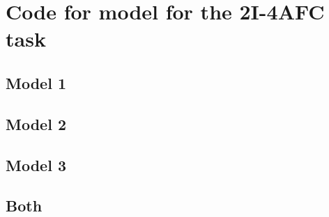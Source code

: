 \documentclass{article}\usepackage{knitr}
\begin{document}
\newpage
\section{Code for model for the 2I-4AFC task}

\subsection{Model 1}


\subsection{Model 2}


\subsection{Model 3}


\subsection{Both}

\end{document}
